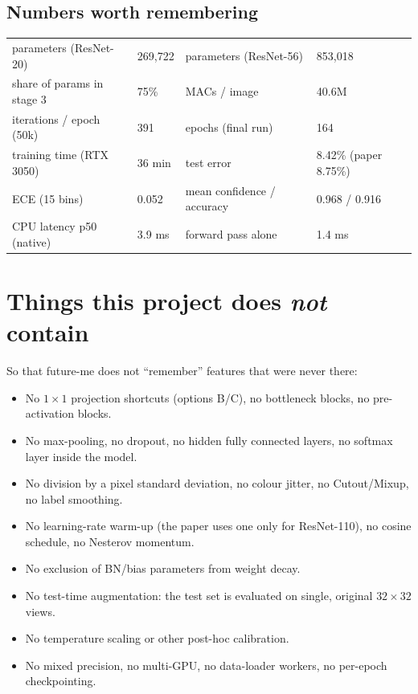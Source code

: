 \subsection*{Numbers worth remembering}
\begin{center}
\small
\begin{tabular}{@{}ll@{\qquad}ll@{}}
\toprule
parameters (ResNet-20) & 269{,}722 & parameters (ResNet-56) & 853{,}018\\
share of params in stage 3 & 75\% & MACs / image & 40.6M\\
iterations / epoch (50k) & 391 & epochs (final run) & 164\\
training time (RTX 3050) & 36 min & test error & 8.42\% (paper 8.75\%)\\
ECE (15 bins) & 0.052 & mean confidence / accuracy & 0.968 / 0.916\\
CPU latency p50 (native) & 3.9 ms & forward pass alone & 1.4 ms\\
\bottomrule
\end{tabular}
\end{center}

\section{Things this project does \emph{not} contain}
\label{sec:notin}

So that future-me does not ``remember'' features that were never there:
\begin{itemize}[nosep]
  \item No $1{\times}1$ projection shortcuts (options B/C), no bottleneck blocks, no pre-activation blocks.
  \item No max-pooling, no dropout, no hidden fully connected layers, no softmax layer inside the model.
  \item No division by a pixel standard deviation, no colour jitter, no Cutout/Mixup, no label smoothing.
  \item No learning-rate warm-up (the paper uses one only for ResNet-110), no cosine schedule, no Nesterov momentum.
  \item No exclusion of BN/bias parameters from weight decay.
  \item No test-time augmentation: the test set is evaluated on single, original $32{\times}32$ views.
  \item No temperature scaling or other post-hoc calibration.
  \item No mixed precision, no multi-GPU, no data-loader workers, no per-epoch checkpointing.
\end{itemize}

